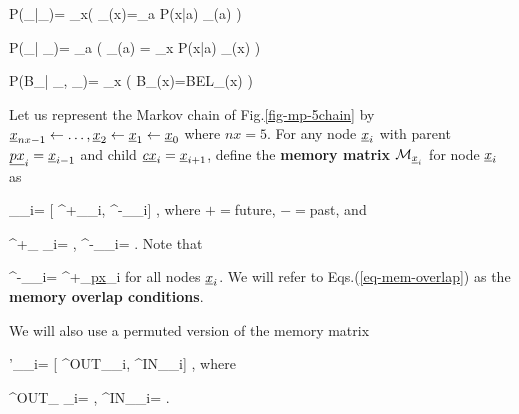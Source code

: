 \beq\color{blue}
P(\pi_{\rvb\ldart\rvx}|\pi_{\rvx\ldart\rva})=
\prod_{x}\indi\left(
\pi_{\rvb\ldart\rvx}(x)=\sum_a P(x|a)
\pi_{\rvx\ldart\rva}(a)
\right)
\label{eq-pr-pi-bar-pi}
\eeq

\beq\color{blue}
P(\lam_{\rvx\rdart \rva}|
\lam_{\rvb\rdart \rvx})=
\prod_{a}
\indi\left(
\lam_{\rvx\rdart \rva}(a)
=
\sum_x P(x|a)
\lam_{\rvb\rdart \rvx}(x)
\right)
\label{eq-pr-lam-bar-lam}
\eeq

\beq\color{blue}
P(B_\rvx|
\pi_{\rvb\ldart \rvx},
\lam_{\rvb\rdart \rvx})=
\prod_x
\indi\left(
B_\rvx(x)=BEL_\rvx(x)
\right)
\eeq



Let us represent the Markov
chain of Fig.\ref{fig-mp-5chain}
by
$\rvx_{nx-1}
\larrow \ldots, \rvx_2\larrow \rvx_1\larrow \rvx_0$
where $nx=5$.
For any node 
$\rvx_i$
with
parent $\ul{px}_i=\rvx_{i-1}$
and child $\ul{cx}_i=\rvx_{i+1}$, 
define
the {\bf memory matrix}
$\calm_{\rvx_i}$
for node $\rvx_i$
as

\beq
\calm_{\rvx_i}=
[
\calm^+_{\rvx_i},
\calm^-_{\rvx_i}]
\;,
\eeq
where $+=$future, $-=$past, and 

\beq
\calm^+_{ \rvx_i}=
\;, 
\;\;\;
\calm^-_{\rvx_i}=
\;.
\eeq 
Note that

\beq
\calm^-_{\rvx_i}=
\calm^+_{\ul{px}_i}
\label{eq-mem-overlap}
\eeq
for all nodes $\rvx_i$.
We will refer to
Eqs.(\ref{eq-mem-overlap}) as
the {\bf memory overlap
conditions}.

We will also use a permuted version of the 
memory matrix

\beq
\calm'_{\rvx_i}=
[
\calm^{OUT}_{\rvx_i},
\calm^{IN}_{\rvx_i}]
\;,
\eeq
where

\beq
\calm^{OUT}_{ \rvx_i}=
\;, 
\;\;\;
\calm^{IN}_{\rvx_i}=
\;.
\eeq

